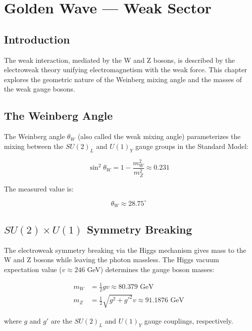 \chapter{Golden Wave — Weak Sector}
\label{ch:17}

\section{Introduction}

The weak interaction, mediated by the W and Z bosons, is described by the electroweak theory unifying electromagnetism with the weak force. This chapter explores the geometric nature of the Weinberg mixing angle and the masses of the weak gauge bosons.

\section{The Weinberg Angle}

The Weinberg angle $\theta_W$ (also called the weak mixing angle) parameterizes the mixing between the $SU(2)_L$ and $U(1)_Y$ gauge groups in the Standard Model:

\begin{equation}
\sin^2\theta_W = 1 - \frac{m_W^2}{m_Z^2} \approx 0.231
\end{equation}

The measured value is:

\begin{equation}
\theta_W \approx 28.75^\circ
\end{equation}

\section{$SU(2) \times U(1)$ Symmetry Breaking}

The electroweak symmetry breaking via the Higgs mechanism gives mass to the W and Z bosons while leaving the photon massless. The Higgs vacuum expectation value ($v \approx 246$ GeV) determines the gauge boson masses:

\begin{align}
m_W &= \frac{1}{2} g v \approx 80.379 \text{ GeV} \\
m_Z &= \frac{1}{2} \sqrt{g^2 + g'^2} v \approx 91.1876 \text{ GeV}
\end{align}

where $g$ and $g'$ are the $SU(2)_L$ and $U(1)_Y$ gauge couplings, respectively.

